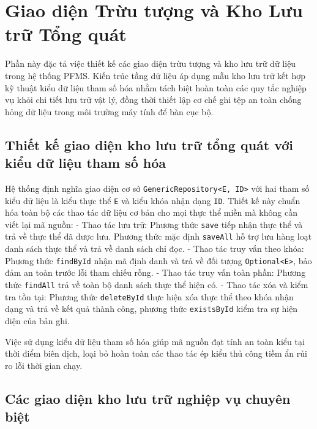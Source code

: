 \documentclass[a4paper,12pt]{report}
\newcommand{\passthrough}[1]{#1}
\begin{document}
\chapter{Giao diện Trừu tượng và Kho Lưu trữ Tổng
quát}\label{giao-diux1ec7n-trux1eebu-tux1b0ux1ee3ng-vuxe0-kho-lux1b0u-trux1eef-tux1ed5ng-quuxe1t}

Phần này đặc tả việc thiết kế các giao diện trừu tượng và kho lưu trữ dữ
liệu trong hệ thống PFMS. Kiến trúc tầng dữ liệu áp dụng mẫu kho lưu trữ
kết hợp kỹ thuật kiểu dữ liệu tham số hóa nhằm tách biệt hoàn toàn các
quy tắc nghiệp vụ khỏi chi tiết lưu trữ vật lý, đồng thời thiết lập cơ
chế ghi tệp an toàn chống hỏng dữ liệu trong môi trường máy tính để bàn
cục bộ.

\section{Thiết kế giao diện kho lưu trữ tổng quát với kiểu dữ liệu tham
số
hóa}\label{thiux1ebft-kux1ebf-giao-diux1ec7n-kho-lux1b0u-trux1eef-tux1ed5ng-quuxe1t-vux1edbi-kiux1ec3u-dux1eef-liux1ec7u-tham-sux1ed1-huxf3a}

Hệ thống định nghĩa giao diện cơ sở
\passthrough{\lstinline!GenericRepository<E, ID>!} với hai tham số kiểu
dữ liệu là kiểu thực thể \passthrough{\lstinline!E!} và kiểu khóa nhận
dạng \passthrough{\lstinline!ID!}. Thiết kế này chuẩn hóa toàn bộ các
thao tác dữ liệu cơ bản cho mọi thực thể miền mà không cần viết lại mã
nguồn: - Thao tác lưu trữ: Phương thức \passthrough{\lstinline!save!}
tiếp nhận thực thể và trả về thực thể đã được lưu. Phương thức mặc định
\passthrough{\lstinline!saveAll!} hỗ trợ lưu hàng loạt danh sách thực
thể và trả về danh sách chỉ đọc. - Thao tác truy vấn theo khóa: Phương
thức \passthrough{\lstinline!findById!} nhận mã định danh và trả về đối
tượng \passthrough{\lstinline!Optional<E>!}, bảo đảm an toàn trước lỗi
tham chiếu rỗng. - Thao tác truy vấn toàn phần: Phương thức
\passthrough{\lstinline!findAll!} trả về toàn bộ danh sách thực thể hiện
có. - Thao tác xóa và kiểm tra tồn tại: Phương thức
\passthrough{\lstinline!deleteById!} thực hiện xóa thực thể theo khóa
nhận dạng và trả về kết quả thành công, phương thức
\passthrough{\lstinline!existsById!} kiểm tra sự hiện diện của bản ghi.

Việc sử dụng kiểu dữ liệu tham số hóa giúp mã nguồn đạt tính an toàn
kiểu tại thời điểm biên dịch, loại bỏ hoàn toàn các thao tác ép kiểu thủ
công tiềm ẩn rủi ro lỗi thời gian chạy.

\section{Các giao diện kho lưu trữ nghiệp vụ chuyên
biệt}\label{cuxe1c-giao-diux1ec7n-kho-lux1b0u-trux1eef-nghiux1ec7p-vux1ee5-chuyuxean-biux1ec7t}
\end{document}
